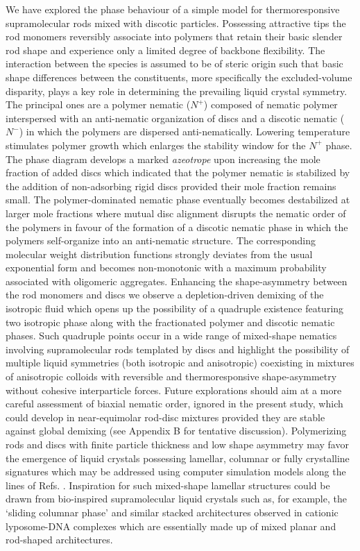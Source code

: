 We have explored the phase behaviour of a simple model for thermoresponsive supramolecular rods mixed with discotic particles. Possessing attractive tips the rod monomers reversibly associate into polymers that retain their basic slender rod shape and experience only a limited degree of backbone flexibility. The interaction between the species is assumed to be  of steric origin such that basic shape differences between the constituents, more specifically the excluded-volume disparity, plays a key role in determining the prevailing liquid crystal symmetry. The principal ones are a   polymer nematic ($N^{+}$) composed of nematic polymer interspersed with an anti-nematic organization of discs and a discotic nematic  ($N^{-}$) in which the polymers are dispersed anti-nematically.   Lowering   temperature stimulates  polymer growth which  enlarges the stability window for the $N^{+}$ phase.  The phase diagram  develops a marked {\em azeotrope} upon increasing the mole fraction of added discs which indicated that the  polymer nematic is stabilized by the addition of non-adsorbing rigid discs provided their mole fraction remains small. 
The polymer-dominated nematic phase eventually becomes destabilized at larger mole fractions where mutual disc alignment disrupts  the nematic  order of the polymers in favour of the formation of a discotic nematic phase in which the polymers self-organize into an anti-nematic structure. The corresponding molecular weight distribution functions strongly deviates from the usual exponential form and becomes non-monotonic with a maximum probability associated with oligomeric aggregates. Enhancing the shape-asymmetry between the rod monomers and discs we observe a depletion-driven demixing of the isotropic fluid which opens up the possibility of a quadruple existence featuring two isotropic phase along with the fractionated polymer and discotic nematic phases. Such quadruple points occur in a wide range of mixed-shape nematics involving supramolecular rods templated by discs and highlight the possibility of multiple liquid symmetries (both isotropic and anisotropic) coexisting in  mixtures of anisotropic colloids with reversible and thermoresponsive shape-asymmetry without cohesive interparticle forces.   Future explorations should aim at a more careful assessment of biaxial nematic order, ignored in the present study,  which could develop in near-equimolar rod-disc mixtures provided they are stable against global demixing (see Appendix B for tentative discussion). Polymerizing rods and discs with finite particle thickness and low shape asymmetry may favor the emergence of liquid crystals possessing lamellar, columnar or fully crystalline signatures  \cite{peroukidis2010} which may be addressed using  computer simulation models along the lines of Refs. \cite{kuriabova2010,nguyen2014,perouklapp2020}. Inspiration for such mixed-shape  lamellar structures  could be drawn from bio-inspired supramolecular liquid crystals \cite{safinya2013} such as, for example, the `sliding columnar phase' and similar stacked architectures  observed in cationic lyposome-DNA complexes \cite{wong2000,ohern1998} which are essentially made up of mixed planar and rod-shaped architectures. 

